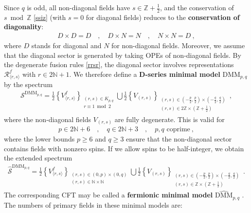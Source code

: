 \documentclass[12pt, a4paper]{article}
\newcommand{\myindex}[1]{\textbf{\boldmath #1}}
\begin{document}
Since $q$ is odd, all non-diagonal fields have $s\in \mathbb{Z}+\frac12$, and the conservation of $s\bmod \mathbb{Z}$ \eqref{ssiz} (with $s=0$ for diagonal fields) reduces to the \myindex{conservation of diagonality}:
\begin{align}
D\times D = D \quad , \quad D\times N = N \quad , \quad N\times N = D \ ,
\label{ddd}
\end{align}
where $D$ stands for diagonal and $N$ for non-diagonal fields. 
Moreover, we assume that the diagonal sector is generated by taking OPEs of non-diagonal fields. 
By the degenerate fusion rules \eqref{rrsr}, the diagonal sector involves representations $\mathcal{R}^f_{\langle r,s\rangle}$ with $r\in 2\mathbb{N}+1$. We therefore define a \myindex{D-series minimal model} $\text{DMM}_{p,q}$ by the spectrum
\begin{align}
 \boxed{\mathcal{S}^{\text{DMM}_{p,q}} = \frac12\left\{ V^f_{\langle r,s\rangle} \right\}_{\substack{(r,s)\in K_{p, q}\\ r\equiv 1\bmod 2}} 
 \bigcup 
 \frac12\left\{V_{(r,s)} \right\}_{\substack{(r,s)\in (-\frac{p}{2},\frac{p}{2})\times (-\frac{q}{2},\frac{q}{2})\\ (r,s)\in 2\mathbb{Z}\times (\mathbb{Z}+\frac12)}}
}\ ,
\label{sdmm}
\end{align}
where the non-diagonal fields $V_{(r,s)}$ are fully degenerate. This is valid for 
\begin{align}
 \boxed{p\in 2\mathbb{N}+6 \quad , \quad q \in 2\mathbb{N}+3 \quad ,\quad p,q\text{ coprime}} \ ,
\end{align}
where the lower bounds $p\geq 6$ and $q\geq 3$ ensure that the non-diagonal sector contains fields with nonzero spins. If we allow spins to be half-integer, we obtain the extended spectrum
\begin{align}
 \widehat{\mathcal{S}}^{\text{DMM}_{p,q}} = \frac12\left\{ V^f_{\langle r,s\rangle} \right\}_{\substack{(r,s)\in (0,p) \times (0,q)\\ (r,s)\in \mathbb{N}\times \mathbb{N}}} 
 \bigcup 
 \frac12\left\{V_{(r,s)} \right\}_{\substack{(r,s)\in (-\frac{p}{2},\frac{p}{2})\times (-\frac{q}{2},\frac{q}{2})\\ (r,s)\in \mathbb{Z}\times (\mathbb{Z}+\frac12)}}
\ .
\end{align}
The corresponding CFT may be called a \myindex{fermionic minimal model} $\widehat{\text{DMM}}_{p,q}$ \cite{rw20}. The numbers of primary fields in these minimal models are:
\end{document}
